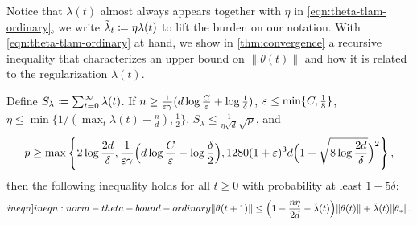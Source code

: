 Notice that $\lambda(t)$ almost always appears together with $\eta$ in \cref{eqn:theta-tlam-ordinary}, we write $\tilde{\lambda}_t \coloneqq \eta\lambda(t)$ to lift the burden on our notation. With \cref{eqn:theta-tlam-ordinary} at hand, we show in \cref{thm:convergence} a recursive inequality that characterizes an upper bound on $\|\theta(t)\|$ and how it is related to the regularization $\lambda(t)$.
 
\begin{theorem}\label{thm:convergence}
    Define $S_\lambda\coloneqq\sum_{t=0}^\infty\lambda(t)$. If $n \geq \frac{1}{\varepsilon\gamma} (d\log\frac{C}{\varepsilon} + \log\frac{1}{\delta})$, $\varepsilon \leq \min\{C,\frac{1}{8}\}$, $\eta\leq \min\{1/(\max_t\lambda(t) + \frac{n}{d}),\frac{1}{2}\}$, $S_\lambda\leq \frac{1}{\eta\sqrt{d}}\sqrt{p}$, and
    \begin{align*}
        p \geq \max\left\{2\log\frac{2d}{\delta},\frac{1}{\varepsilon\gamma} \Big(d\log\frac{C}{\varepsilon} - \log\frac{\delta}{2}\Big),1280(1+\varepsilon)^3d \Big(1+\sqrt{8\log\frac{2d}{\delta}}\Big)^2\right\},
    \end{align*}
    then the following inequality holds for all $t\geq 0$ with probability at least $1-5\delta$:
        \begin{align}\label[ineqn]{ineqn:norm-theta-bound-ordinary}
            \|\theta(t+1)\| \leq \Big(1-\frac{n\eta}{2d}-\tlam(t) \Big)\|\theta(t)\| + \tlam(t)\|\theta_\ast\|. 
        \end{align}
\end{theorem}


